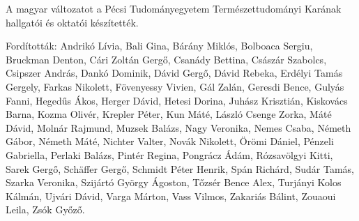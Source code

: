 {
A magyar változatot a Pécsi Tudományegyetem Természettudományi Karának hallgatói és oktatói készítették.

Fordították: Andrikó Lívia, Bali Gina, Bárány Miklós, Bolboaca Sergiu, Bruckman Denton,
Cári Zoltán Gergő, Csanády Bettina, Császár Szabolcs, Csipszer András, Dankó Dominik, Dávid Gergő, Dávid Rebeka, Erdélyi Tamás Gergely,
Farkas Nikolett, Fövenyessy Vivien, Gál Zalán, Geresdi Bence, Gulyás Fanni,
Hegedűs Ákos, Herger Dávid, Hetesi Dorina,
Juhász Krisztián, Kiskovács Barna, Kozma Olivér, Krepler Péter, Kun Máté,
László Csenge Zorka, Máté Dávid, Molnár Rajmund, Muzsek Balázs,
Nagy Veronika, Nemes Csaba, Németh Gábor, Németh Máté, Nichter Valter, Novák Nikolett,
Örömi Dániel,
Pénzeli Gabriella, Perlaki Balázs, Pintér Regina, Pongrácz Ádám,
Rózsavölgyi Kitti,
Sarek Gergő, Schäffer Gergő, Schmidt Péter Henrik, Spán Richárd, Sudár Tamás,
Szarka Veronika, Szijártó György Ágoston,
Tőzsér Bence Alex, Turjányi Kolos Kálmán, Ujvári Dávid,
Varga Márton, Vass Vilmos, Zakariás Bálint, Zouaoui Leila, Zsók Győző.
}